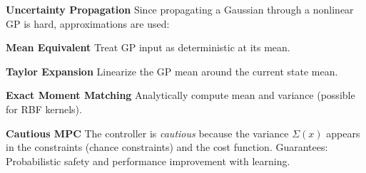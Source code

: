 \textbf{Uncertainty Propagation}
Since propagating a Gaussian through a nonlinear GP is hard,
approximations are used:

\textbf{Mean Equivalent}
Treat GP input as deterministic at its mean.

\textbf{Taylor Expansion}
Linearize the GP mean around the current state mean.

\textbf{Exact Moment Matching}
Analytically compute mean and variance (possible for RBF kernels).

\textbf{Cautious MPC}
The controller is \textit{cautious} because
the variance $\Sigma(x)$ appears in the constraints
(chance constraints) and the cost function.
Guarantees: Probabilistic safety and performance improvement with learning.

